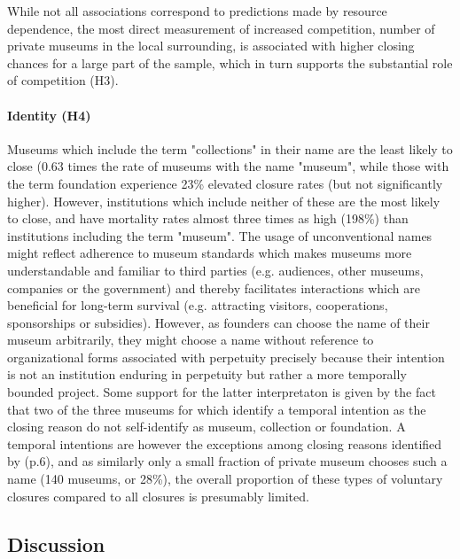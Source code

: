 \documentclass[12pt]{article}
\begin{document}
While not all associations correspond to predictions made by resource dependence, the most direct measurement of increased competition, number of private museums in the local surrounding, is associated with higher closing chances for a large part of the sample, which in turn supports the substantial role of competition (H3).
\paragraph*{Identity (H4)}


Museums which include the term "collections" in their name are the least likely to close (0.63 times the rate of museums with the name "museum", while those with the term foundation experience 23\% elevated closure rates (but not significantly higher).
However, institutions which include neither of these are the most likely to close, and have mortality rates almost three times as high (198\%) than institutions including the term "museum".
The usage of unconventional names might reflect adherence to museum standards which makes museums more understandable and familiar to third parties (e.g. audiences, other museums, companies or the government) and thereby facilitates interactions which are beneficial for long-term survival (e.g. attracting visitors, cooperations, sponsorships or subsidies).
However, as founders can choose the name of their museum arbitrarily, they might choose a name without reference to organizational forms associated with perpetuity precisely because their intention is not an institution enduring in perpetuity but rather a more temporally bounded project.
Some support for the latter interpretaton is given by the fact that two of the three museums for which \textcite{Velthuis_Gera_2024_fragility} identify a temporal intention as the closing reason do not self-identify as museum, collection or foundation.
A temporal intentions are however the exceptions among closing reasons identified by \textcite{Velthuis_Gera_2024_fragility} (p.6), and as similarly only a small fraction of private museum chooses such a name (140 museums, or 28\%), the overall proportion of these types of voluntary closures compared to all closures is presumably limited.
\subsection*{Discussion}
\end{document}
